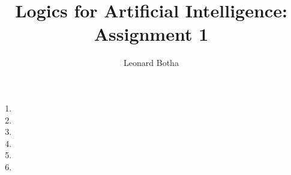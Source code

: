 \documentclass[12pt,a4paper]{article}
\title{{\bf Logics for Artificial Intelligence:}\\
Assignment 1}
\author{Leonard Botha}
\begin{document}
\maketitle
\begin{enumerate}
\item 
\item 
\item 
\item 
\item 
\item 
\end{enumerate}
% 
\end{document}
